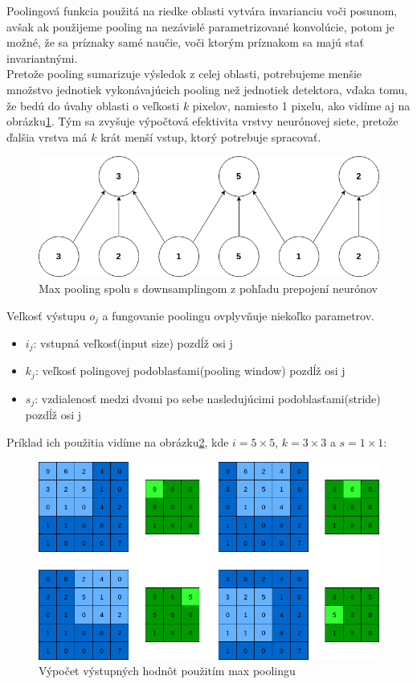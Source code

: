 \indent Poolingová funkcia použitá na riedke oblasti vytvára invarianciu voči posunom, avšak ak použijeme pooling na nezávislé parametrizované konvolúcie, potom je možné, že sa príznaky samé naučie, voči ktorým príznakom sa majú stať invariantnými\cite{goodfellow2016deep}. \\

\indent Pretože pooling sumarizuje výsledok z celej oblasti, potrebujeme menšie množstvo jednotiek vykonávajúcich pooling než jednotiek detektora, vďaka tomu, že bedú do úvahy oblasti o veľkosti $k$ pixelov, namiesto 1 pixelu, ako vidíme aj na obrázku\ref{fig:pooling}.
Tým sa zvyšuje výpočtová efektivita vrstvy neurónovej siete, pretože ďalšia vrstva má $k$ krát menší vstup, ktorý potrebuje spracovať.\cite{goodfellow2016deep} \\

\begin{figure}[H]
	\centering
	\includegraphics[width=0.5\linewidth]{img/pooling}
	\caption{Max pooling spolu s downsamplingom z pohľadu prepojení neurónov}
	\label{fig:pooling}
\end{figure}

Veľkosť výstupu $o_{j}$ a fungovanie poolingu ovplyvňuje niekoľko parametrov.

\begin{itemize}
		\item $i_{j}$: vstupná veľkosť(input size) pozdĺž osi j
		\item $k_{j}$: veľkosť polingovej podoblasťami(pooling window) pozdĺž osi j
		\item $s_{j}$: vzdialenosť medzi dvomi po sebe nasledujúcimi podoblasťami(stride) pozdĺž osi j
\end{itemize}

Príklad ich použitia vidíme na obrázku\ref{fig:poolingex}, kde $i = 5 \times 5$, $k = 3 \times 3$ a  $s = 1 \times 1$:

\begin{figure}[H]
	\centering
	\includegraphics[width=1\linewidth]{img/poolingex}
	\caption{Výpočet výstupných hodnôt použitím max poolingu}
	\label{fig:poolingex}
\end{figure}

